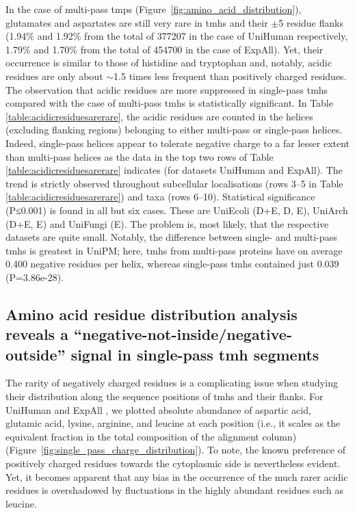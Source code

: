 In the case of multi-pass \gls{tmp}s (Figure~\ref{fig:amino_acid_distribution}), glutamates and aspartates are still very rare in \gls{tmh}s and their $\pm$5 residue flanks (1.94\% and 1.92\% from the total of 377207 in the case of UniHuman respectively, 1.79\% and 1.70\% from the total of 454700 in the case of ExpAll).
Yet, their occurrence is similar to those of histidine and tryptophan and, notably, acidic residues are only about $\sim$1.5 times less frequent than positively charged residues.
The observation that acidic residues are more suppressed in single-pass \gls{tmh}s compared with the case of multi-pass \gls{tmh}s is statistically significant.
In Table \ref{table:acidicresiduesarerare}, the acidic residues are counted in the helices (excluding flanking regions) belonging to either multi-pass or single-pass helices.
Indeed, single-pass helices appear to tolerate negative charge to a far lesser extent than multi-pass helices as the data in the top two rows of Table \ref{table:acidicresiduesarerare} indicates (for datasets UniHuman and ExpAll).
The trend is strictly observed throughout subcellular localisations (rows 3--5 in Table \ref{table:acidicresiduesarerare}) and taxa (rows 6--10).
Statistical significance (P≤0.001) is found in all but six cases.
These are UniEcoli (D+E, D, E), UniArch (D+E, E) and UniFungi (E).
The problem is, most likely, that the respective datasets are quite small.
Notably, the difference between single- and multi-pass \gls{tmh}s is greatest in UniPM\@; here, \gls{tmh}s from multi-pass proteins have on average 0.400 negative residues per helix, whereas single-pass \gls{tmh}s contained just 0.039 (P=3.86e-28).

\subsection{Amino acid residue distribution analysis reveals a ``negative-not-inside/negative-outside'' signal in single-pass \gls{tmh} segments}

The rarity of negatively charged residues is a complicating issue when studying their distribution along the sequence positions of \gls{tmh}s and their flanks.
For UniHuman and ExpAll , we plotted absolute abundance of aspartic acid, glutamic acid, lysine, arginine, and leucine at each position (i.e., it scales as the equivalent fraction in the total composition of the alignment column) (Figure~\ref{fig:single_pass_charge_distribution}).
To note, the known preference of positively charged residues towards the cytoplasmic side is nevertheless evident.
Yet, it becomes apparent that any bias in the occurrence of the much rarer acidic residues is overshadowed by fluctuations in the highly abundant residues such as leucine.

